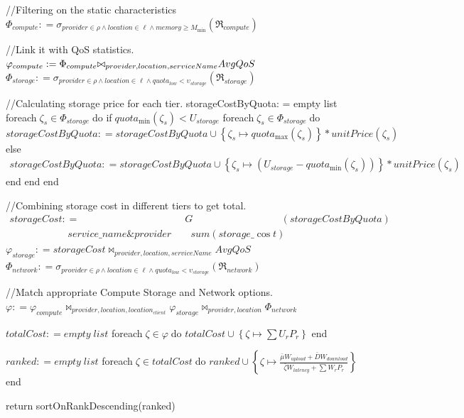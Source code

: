 \begin{algorithm}[float,caption={orderedSolutions $( \ell , {M_{\min }} , price_{\max} , \rho , U , W )$}, label={algo:orderedSolutions}]
//Filtering on the static characteristics
${\Phi _{compute}}: = {\sigma _{provider \in \rho  \wedge location \in \ell  \wedge memory \ge {M_{\min }}}}\left( {{\Re _{compute}}} \right)$

//Link it with QoS statistics.
${\varphi _{compute}}: = {\Phi _{compute}}{{\rm \bowtie}_{provider,location,serviceName}}AvgQoS$
${\Phi _{storage}}: = {\sigma _{provider \in \rho  \wedge location \in \ell  \wedge quot{a_{low}} < {\upsilon _{storage}}}}\left( {{\Re _{storage}}} \right)$

//Calculating storage price for each tier.
storageCostByQuota: = empty list
foreach$\;{\zeta_s} \in {\Phi _{storage}}\;$do
    if$\;quot{a_{\min }}({\zeta_s}) < {U_{storage}}$
        foreach$\;{\zeta_s} \in {\Phi _{storage}}\;$do
            $storageCostByQuota: = storageCostByQuota \cup \left\{ {{\zeta_s} \mapsto quot{a_{\max }}({\zeta_s})} \right\}* unitPrice({\zeta_s})$
        else
            $\begin{array}{l}
                storageCostByQuota: = storageCostByQuota \cup \left\{ {{\zeta_s} \mapsto \left( {{U_{storage}} - quot{a_{\min }}({\zeta_s})} \right)} \right\}*unitPrice({\zeta_s})
            \end{array}$
        end
    end
end

//Combining storage cost in different tiers to get total.
$\begin{array}{l}
storageCost: = \;\;\;\;\;\;\;\;\;\;\;\;\;\;\;\;\;\;\;\;\;\;\;\;\;\;\;\;\;\;\;\;\;\;\;\;\;\;G\;\;\;\;\;\;\;\;\;\;\;\;\;\;\;\;\;\;\;\;\;\;\;\;\;\;\;\;\;\;\;\;(storageCostByQuota)\\
\;\;\;\;\;\;\;\;\;\;\;\;\;\;\;\;\;\;\;\;\;service\_name\& provider\;\;\;\;\;\;\;sum(storage\_\cos t)
\end{array}$
${\varphi _{storage}}: = storageCost{\bowtie_{provider,location,serviceName}}AvgQoS$
${\Phi _{network}}: = {\sigma _{provider \in \rho  \wedge location \in \ell  \wedge quot{a_{low}} < {\upsilon _{storage}}}}({\Re _{network}})$

//Match appropriate Compute Storage and Network options.
$\varphi : = {\varphi _{compute}}{\bowtie_{provider,location,locatio{n_{client}}}}{\varphi _{storage}}{\bowtie_{provider,location}}{\Phi _{network}}$

$totalCost: = empty\;list$
foreach$\;\zeta \in \varphi \;$do
    $totalCost \cup \left\{ {\zeta \mapsto \sum {{U_r}{P_r}} } \right\}$
end

$ranked: = empty\;list$
foreach$\;\zeta \in totalCost\;$do
    $ranked \cup \left\{ {\zeta \mapsto \frac{{\bar \mu {W_{upload}} + \bar D{W_{download}}}}{{\bar \zeta{W_{latency}} + \sum {{W_r}{P_r}} }}} \right\}$
end

return sortOnRankDescending(ranked)
\end{algorithm}

